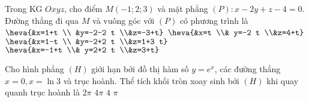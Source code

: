 \begin{ex}%
	Trong KG $Oxyz$, cho điểm $M(-1; 2; 3)$ và mặt phẳng $(P)\colon  x-2y+z-4=0$. Đường thẳng đi qua $M$ và vuông góc với $(P)$ có phương trình là
	\choice
	{$\heva{&x=1+t \\ &y=-2-2 t \\&z=-3+t}$}
	{\True $\heva{&x=t \\& y=-2 t \\&z=4+t}$}
	{$\heva{&x=1-t \\ &y=-2+2 t \\&z=1+3 t}$}
	{$\heva{&x=-1+t \\& y=2+2 t \\&z=3+t}$}
\end{ex}

\begin{ex}%
	Cho hình phẳng $(H)$ giới hạn bởi đồ thị hàm số $y=e^x$, các đường thẳng $x=0, x=\ln 3$ và trục hoành. Thể tích khối tròn xoay sinh bởi $(H)$ khi quay quanh trục hoành là
	\choice
	{$2 \pi$}
	{\True $4 \pi$}
	{$4$}
	{$\pi$}
\end{ex}


